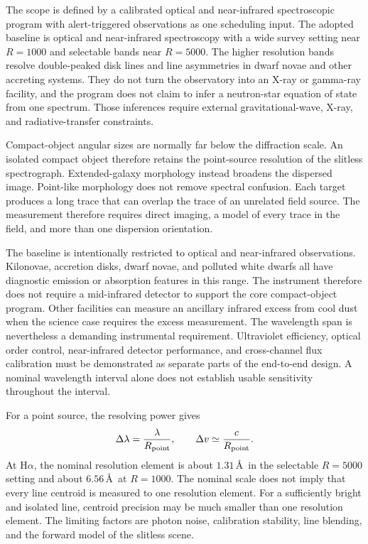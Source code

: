 \documentclass[10pt,onecolumn]{article}
\newcommand{\Rpoint}{R_{\rm point}}
\begin{document}
The scope is defined by a calibrated optical and near-infrared spectroscopic
program with alert-triggered observations as one scheduling input.
The adopted baseline is optical and near-infrared spectroscopy with a wide
survey setting near $R=1000$ and selectable bands near $R=5000$. The higher
resolution bands resolve double-peaked disk lines and line asymmetries in
dwarf novae and other accreting systems. They do not turn the observatory
into an X-ray or gamma-ray facility, and the program does not claim to infer
a neutron-star equation of state from one spectrum. Those inferences require
external gravitational-wave, X-ray, and radiative-transfer constraints.

Compact-object angular sizes are normally far below the diffraction scale.
An isolated compact object therefore retains the point-source resolution of
the slitless spectrograph. Extended-galaxy morphology instead broadens the
dispersed image. Point-like morphology does not remove spectral confusion.
Each target produces a long trace that can overlap the trace of an unrelated
field source. The measurement therefore requires direct imaging, a model of
every trace in the field, and more than one dispersion orientation.

The baseline is intentionally restricted to optical and near-infrared
observations. Kilonovae, accretion disks, dwarf novae, and polluted white
dwarfs all have diagnostic emission or absorption features in this range.
The instrument therefore does not require a mid-infrared detector to support
the core compact-object program. Other facilities can measure an ancillary
infrared excess from cool dust when the science case requires the excess
measurement.
The wavelength span is nevertheless a demanding instrumental requirement.
Ultraviolet efficiency, optical order control, near-infrared detector
performance, and cross-channel flux calibration must be demonstrated as
separate parts of the end-to-end design. A nominal wavelength interval alone
does not establish usable sensitivity throughout the interval.

For a point source, the resolving power gives
\begin{equation}
  \Delta\lambda = \frac{\lambda}{\Rpoint},
  \qquad
  \Delta v \simeq \frac{c}{\Rpoint}.
  \label{eq:resolution}
\end{equation}
At H$\alpha$, the nominal resolution element is about $1.31$\,\AA\ in the
selectable $R=5000$ setting and about $6.56$\,\AA\ at $R=1000$. The nominal
scale does not imply that every line centroid is measured to one resolution
element.
For a sufficiently bright and isolated line, centroid precision may be much
smaller than one resolution element. The limiting factors are photon noise,
calibration stability, line blending, and the forward model of the
slitless scene.
\end{document}
